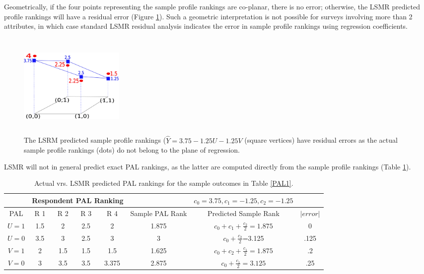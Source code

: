 \documentclass[a4paper, 12pt]{article}
\begin{document}
Geometrically, if the four points representing the sample profile rankings are co-planar, there is no error; otherwise, the LSMR predicted profile rankings will have a residual error (Figure  \ref{sec4fig}).  Such a geometric interpretation  is not possible for surveys involving more than 2 attributes, in which case standard LSMR residual analysis indicates the error in sample  profile rankings using regression coefficients.


\begin{figure}[!htpb]
	\centering
	\includegraphics[width=2in,height=2in]{sec4fig.png}
	\caption{{\small The LSRM predicted sample profile rankings ($\hat{Y}=3.75-1.25U-1.25V$ (square vertices) have residual errors as the actual sample profile rankings (dots) do not belong to the plane of regression. }}	
	\label{sec4fig}
\end{figure}

\newpage
 LSMR will not in general predict exact PAL rankings, as the latter   are computed directly from the sample profile rankings (Table \ref{LSMR2}).

\begin{table}[!htpb]
	\centering
	\scriptsize
	\begin{tabular}{c|cccc|c|c|c}
		&\multicolumn{4}{c|}{Respondent PAL Ranking}&&$c_0=3.75,c_1=-1.25,c_2=-1.25$&\\\hline
		PAL & R 1&  R 2& R 3& R 4 &Sample PAL Rank&Predicted Sample Rank&$|error|$ \\  \hline
		$U=1$ &1.5&2&2.5&2&1.875&$c_0+c_1+\frac{c_2}{2}=1.875$&0\\
		$U=0$&3.5&3&2.5&3&3&$c_0+\frac{c_2}{2}$=3.125&.125 \\
		$V=1$&2&1.5&1.5&1.5&1.625 &$c_0+c_2+\frac{c_1}{2}=1.875$&.2 \\
		$V=0$&3&3.5&3.5&3.375&2.875 &$c_0+\frac{c_1}{2}=3.125$&.25\\\hline
	\end{tabular}
	\caption{{\small Actual vrs. LSMR predicted PAL rankings for the sample outcomes in Table \ref{PAL1}.}}
	\label{LSMR2}
\end{table}
\end{document}
